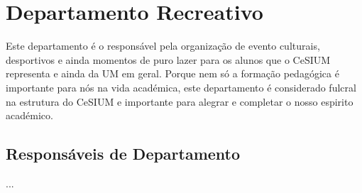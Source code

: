 \section{Departamento Recreativo}

\indent Este departamento é o responsável pela organização de evento culturais, desportivos e ainda momentos de puro lazer para os alunos que o CeSIUM representa e ainda da UM em geral. Porque nem só a formação pedagógica é importante para nós na vida académica, este departamento é considerado fulcral na estrutura do CeSIUM e importante para alegrar e completar o nosso espirito académico.\\

\subsection{Responsáveis de Departamento}
\begin{itemizedash}
	\item ...
\end{itemizedash}
